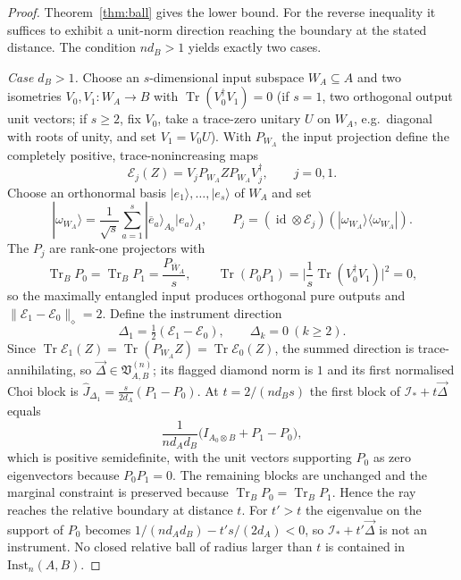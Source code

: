 \documentclass[11pt,a4paper]{article}
\newcommand{\Inst}{\mathrm{Inst}}
\newcommand{\Tr}{\operatorname{Tr}}
\newcommand{\id}{\operatorname{id}}
\newcommand{\Jhat}{\widehat J}
\newcommand{\vD}{\vec{\Delta}}
\begin{document}
\begin{proof}
Theorem~\ref{thm:ball} gives the lower bound. For the reverse inequality it suffices to exhibit a unit-norm direction reaching the boundary at the stated distance. The condition $nd_B>1$ yields exactly two cases.

\emph{Case $d_B>1$.} Choose an $s$-dimensional input subspace $W_A\subseteq A$ and two isometries $V_0,V_1:W_A\to B$ with $\Tr(V_0^\dagger V_1)=0$ (if $s=1$, two orthogonal output unit vectors; if $s\ge2$, fix $V_0$, take a trace-zero unitary $U$ on $W_A$, e.g.\ diagonal with roots of unity, and set $V_1=V_0U$). With $P_{W_A}$ the input projection define the completely positive, trace-nonincreasing maps
\[
\mathcal E_j(Z)=V_jP_{W_A}ZP_{W_A}V_j^\dagger,\qquad j=0,1.
\]
Choose an orthonormal basis $|e_1\rangle,\dots,|e_s\rangle$ of $W_A$ and set
\[
|\omega_{W_A}\rangle=\frac1{\sqrt s}\sum_{a=1}^s|\overline e_a\rangle_{A_0}|e_a\rangle_A,
\qquad
P_j=(\id\otimes\mathcal E_j)(|\omega_{W_A}\rangle\langle\omega_{W_A}|).
\]
The $P_j$ are rank-one projectors with
\[
\Tr_BP_0=\Tr_BP_1=\frac{P_{\overline W_A}}s,
\qquad
\Tr(P_0P_1)=\Big|\frac1s\Tr(V_0^\dagger V_1)\Big|^2=0,
\]
so the maximally entangled input produces orthogonal pure outputs and $\|\mathcal E_1-\mathcal E_0\|_\diamond=2$. Define the instrument direction
\[
\Delta_1=\tfrac12(\mathcal E_1-\mathcal E_0),\qquad \Delta_k=0\ (k\ge2).
\]
Since $\Tr\mathcal E_1(Z)=\Tr(P_{W_A}Z)=\Tr\mathcal E_0(Z)$, the summed direction is trace-annihilating, so $\vD\in\mathfrak V_{A,B}^{(n)}$; its flagged diamond norm is $1$ and its first normalised Choi block is $\Jhat_{\Delta_1}=\tfrac{s}{2d_A}(P_1-P_0)$. At $t=2/(nd_Bs)$ the first block of $\mathcal I_*+t\vD$ equals
\[
\frac1{nd_Ad_B}\big(I_{A_0\otimes B}+P_1-P_0\big),
\]
which is positive semidefinite, with the unit vectors supporting $P_0$ as zero eigenvectors because $P_0P_1=0$. The remaining blocks are unchanged and the marginal constraint is preserved because $\Tr_BP_0=\Tr_BP_1$. Hence the ray reaches the relative boundary at distance $t$. For $t'>t$ the eigenvalue on the support of $P_0$ becomes $1/(nd_Ad_B)-t's/(2d_A)<0$, so $\mathcal I_*+t'\vD$ is not an instrument. No closed relative ball of radius larger than $t$ is contained in $\Inst_n(A,B)$.


\end{proof}
\end{document}

